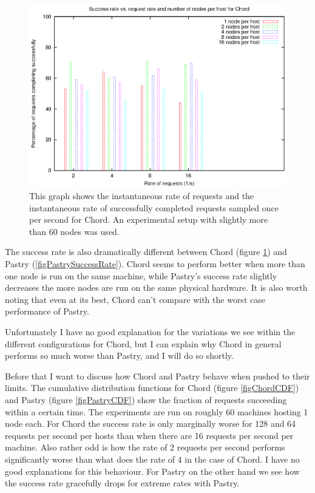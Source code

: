 \begin{figure}[!htbp]
  \begin{center}
    \includegraphics[width=0.9\linewidth]{illustrations/success_rate_chord.eps}
    \caption{This graph shows the instantaneous rate of requests and the instantaneous rate of successfully completed requests sampled once per second for Chord. An experimental setup with slightly more than 60 nodes was used.}
    \label{figChordSuccessRate}
  \end{center}
\end{figure}

The success rate is also dramatically different between Chord (figure \ref{figChordSuccessRate}) and Pastry (\ref{figPastrySuccessRate}). Chord seems to perform better when more than one node is run on the same machine, while Pastry's success rate slightly decreases the more nodes are run on the same physical hardware. It is also worth noting that even at its best, Chord can't compare with the worst case performance of Pastry.

Unfortunately I have no good explanation for the variations we see within the different configurations for Chord, but I can explain why Chord in general performs so much worse than Pastry, and I will do so shortly.

Before that I want to discuss how Chord and Pastry behave when pushed to their limits. The cumulative distribution functions for Chord (figure \ref{figChordCDF}) and Pastry (figure \ref{figPastryCDF}) show the fraction of requests succeeding within a certain time. The experiments are run on roughly 60 machines hosting 1 node each. 
For Chord the success rate is only marginally worse for 128 and 64 requests per second per hosts than when there are 16 requests per second per machine. Also rather odd is how the rate of 2 requests per second performs significantly worse than what does the rate of 4 in the case of Chord. I have no good explanations for this behaviour.
For Pastry on the other hand we see how the success rate gracefully drops for extreme rates with Pastry.

